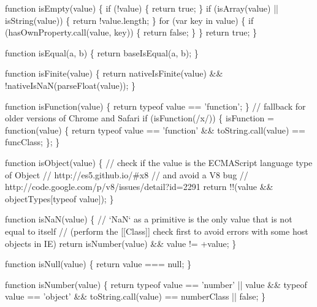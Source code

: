 \begin{DoxyCodeInclude}
{{  \textcolor{keyword}{function} isEmpty(value) \{
    \textcolor{keywordflow}{if} (!value) \{
      \textcolor{keywordflow}{return} \textcolor{keyword}{true};
    \}
    \textcolor{keywordflow}{if} (isArray(value) || isString(value)) \{
      \textcolor{keywordflow}{return} !value.length;
    \}
    \textcolor{keywordflow}{for} (var key in value) \{
      \textcolor{keywordflow}{if} (hasOwnProperty.call(value, key)) \{
        \textcolor{keywordflow}{return} \textcolor{keyword}{false};
      \}
    \}
    \textcolor{keywordflow}{return} \textcolor{keyword}{true};
  \}

  \textcolor{keyword}{function} isEqual(a, b) \{
    \textcolor{keywordflow}{return} baseIsEqual(a, b);
  \}

  \textcolor{keyword}{function} isFinite(value) \{
    \textcolor{keywordflow}{return} nativeIsFinite(value) && !nativeIsNaN(parseFloat(value));
  \}

  \textcolor{keyword}{function} isFunction(value) \{
    \textcolor{keywordflow}{return} typeof value == \textcolor{stringliteral}{'function'};
  \}
  \textcolor{comment}{// fallback for older versions of Chrome and Safari}
  \textcolor{keywordflow}{if} (isFunction(/x/)) \{
    isFunction = \textcolor{keyword}{function}(value) \{
      \textcolor{keywordflow}{return} typeof value == \textcolor{stringliteral}{'function'} && toString.call(value) == funcClass;
    \};
  \}

  \textcolor{keyword}{function} isObject(value) \{
    \textcolor{comment}{// check if the value is the ECMAScript language type of Object}
    \textcolor{comment}{// http://es5.github.io/#x8}
    \textcolor{comment}{// and avoid a V8 bug}
    \textcolor{comment}{// http://code.google.com/p/v8/issues/detail?id=2291}
    \textcolor{keywordflow}{return} !!(value && objectTypes[typeof value]);
  \}

  \textcolor{keyword}{function} isNaN(value) \{
    \textcolor{comment}{// `NaN` as a primitive is the only value that is not equal to itself}
    \textcolor{comment}{// (perform the [[Class]] check first to avoid errors with some host objects in IE)}
    \textcolor{keywordflow}{return} isNumber(value) && value != +value;
  \}

  \textcolor{keyword}{function} isNull(value) \{
    \textcolor{keywordflow}{return} value === null;
  \}

  \textcolor{keyword}{function} isNumber(value) \{
    \textcolor{keywordflow}{return} typeof value == \textcolor{stringliteral}{'number'} ||
      value && typeof value == \textcolor{stringliteral}{'object'} && toString.call(value) == numberClass || \textcolor{keyword}{false};
  \}

}}
\end{DoxyCodeInclude}
